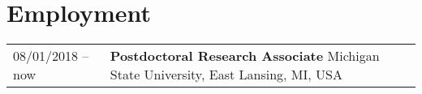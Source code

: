 \section*{Employment}
\begin{tabular}{p{} p{}}
08/01/2018 -- now & \textbf{Postdoctoral Research Associate} \newline
		            Michigan State University, East Lansing, MI, USA \\ 
\end{tabular}
